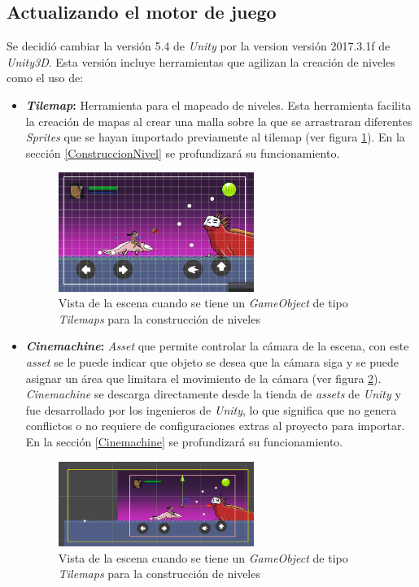 \subsection{Actualizando el motor de juego}
Se decidió cambiar la versión 5.4 de \textit{Unity} por la version versión 
2017.3.1f de \textit{Unity3D}. Esta versión incluye herramientas que agilizan la 
creación de niveles como el uso de: 
	\begin{itemize}
		\item \textbf{\textit{Tilemap}:} Herramienta para el mapeado de niveles. Esta 
		herramienta facilita la creación de mapas al crear una malla sobre la que 
		se arrastraran diferentes \textit{Sprites} que se hayan importado previamente 
		al tilemap (ver figura \ref{fig:TilemapPantalla}). En la sección 
		\ref{ConstruccionNivel} se profundizará su funcionamiento.
		
		\begin{figure}[h]
    			\centering
    			\includegraphics[width=0.6\textwidth]{02Antecedentes/Imagenes/tilemaps01.png}
    			\caption{Vista de la escena cuando se tiene un \textit{GameObject} de 
    			tipo \textit{Tilemaps} para la construcción de niveles}
    			\label{fig:TilemapPantalla}
		\end{figure}
		
		\item \textbf{\textit{Cinemachine}:} \textit{Asset} que permite controlar la 
		cámara de la escena, con este \textit{asset} se le puede indicar que objeto se 
		desea que la cámara siga y se puede asignar un área que limitara el movimiento 
		de la cámara (ver figura \ref{fig:CinemaPantalla}). \textit{Cinemachine} se 
		descarga directamente desde la tienda de \textit{assets} de \textit{Unity} y 
		fue desarrollado por los ingenieros de \textit{Unity}, lo que significa que 
		no genera conflictos o no requiere de configuraciones extras al proyecto para 
		importar. En la sección \ref{Cinemachine} se profundizará su funcionamiento.
			
			\begin{figure}[h]
    			\centering
    			\includegraphics[width=0.6\textwidth]{02Antecedentes/Imagenes/cinemachine01.png}
    			\caption{Vista de la escena cuando se tiene un \textit{GameObject} de 
    			tipo \textit{Tilemaps} para la construcción de niveles}
    			\label{fig:CinemaPantalla}
			\end{figure}


\end{itemize}
